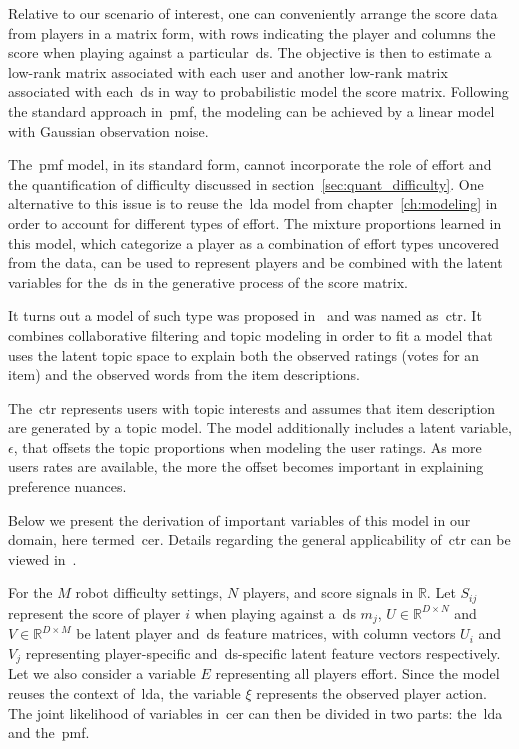 Relative to our scenario of interest, one can conveniently arrange the score data from players in a matrix form, with rows indicating the player and columns the score when playing against a particular~\gls{ds}. The objective is then to estimate a low-rank matrix associated with each user and another low-rank matrix associated with each~\gls{ds} in way to probabilistic model the score matrix. Following the standard approach in~\gls{pmf}, the modeling can be achieved by a linear model with Gaussian observation noise. 

The~\gls{pmf} model, in its standard form, cannot incorporate the role of effort and the quantification of difficulty discussed in section~\ref{sec:quant_difficulty}. One alternative to this issue is to reuse the~\gls{lda} model from chapter~\ref{ch:modeling} in order to account for different types of effort. The mixture proportions learned in this model, which categorize a player as a combination of effort types uncovered from the data, can be used to represent players and be combined with the latent variables for the~\gls{ds} in the generative process of the score matrix.

It turns out a model of such type was proposed in~\cite{wang_collaborative_2011} and was named as~\gls{ctr}. It combines collaborative filtering and topic modeling in order to fit a model that uses the latent topic space to explain both the observed ratings (votes for an item) and the observed words from the item descriptions. 

The~\gls{ctr} represents users with topic interests and assumes that item description are generated by a topic model. The model additionally includes a latent variable, $\epsilon$, that offsets the topic proportions when modeling the user ratings. As more users rates are available, the more the offset becomes important in explaining preference nuances.

Below we present the derivation of important variables of this model in our domain, here termed~\gls{cer}. Details regarding the general applicability of~\gls{ctr} can be viewed in~\cite{wang_collaborative_2011}.

For the $M$ robot difficulty settings, $N$ players, and score signals in $\mathbb{R}$. Let $S_{ij}$ represent the score of player $i$ when playing against a~\gls{ds} $m_{j}$, $U \in \mathbb{R}^{D\times N}$ and $V \in \mathbb{R}^{D\times M}$ be latent player and~\gls{ds} feature matrices, with column vectors $U_i$ and $V_j$ representing player-specific and~\gls{ds}-specific latent feature vectors respectively. Let we also consider a variable $E$ representing all players effort. Since the model reuses the context of~\gls{lda}, the variable $\xi$ represents the observed player action. The joint likelihood of variables in~\gls{cer} can then be divided in two parts: the~\gls{lda} and the~\gls{pmf}.

